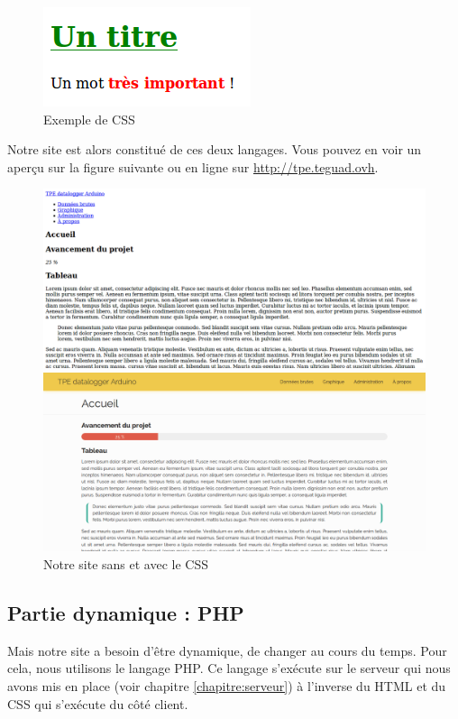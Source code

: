 \begin{figure}[!h]
	\centering
	\includegraphics[width=.2\linewidth]{Images/Exemple_CSS}
	\caption{Exemple de CSS}
\end{figure}

Notre site est alors constitué de ces deux langages. Vous pouvez en voir un aperçu sur la figure suivante ou en ligne sur \url{http://tpe.teguad.ovh}.

\begin{figure}[!h]
	\begin{minipage}{.5\linewidth}
		\centering
		\includegraphics[width=.9\linewidth]{Images/Site_sans_CSS}
	\end{minipage}%
	\begin{minipage}{.5\linewidth}
		\centering
		\includegraphics[width=.9\linewidth]{Images/Site_avec_CSS}
	\end{minipage}
	\caption{Notre site sans et avec le CSS}
\end{figure}

\subsection{Partie dynamique : PHP}

Mais notre site a besoin d'être dynamique, de changer au cours du temps. Pour cela, nous utilisons le langage PHP. Ce langage s'exécute sur le serveur qui nous avons mis en place (voir chapitre \ref{chapitre:serveur}) à l'inverse du HTML et du CSS qui s'exécute du côté client.

